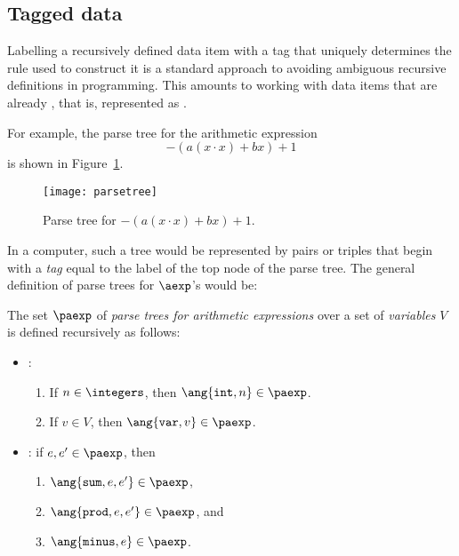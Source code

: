 \begin{definition}
\begin{editingnotes}

\section{Tagged data}

Labelling a recursively defined data item with a tag that uniquely
determines the rule used to construct it is a standard approach to
avoiding ambiguous recursive definitions in programming.  This
amounts to working with data items that are already , that
is, represented as .

For example, the parse tree for the arithmetic expression
\begin{equation}\label{ax}
-(a(x\cdot x)+ bx) + 1
\end{equation}
is shown in Figure~\ref{fig:parse}.

\begin{figure}
\texttt{[image: parsetree]}
\caption{Parse tree for $-(a(x\cdot x)+ bx) + 1$.}
\label{fig:parse}
\end{figure}

In a computer, such a tree would be represented by pairs or triples
that begin with a
\emph{tag} equal to the label of the top node of the parse tree.  
The general definition of parse trees for $\aexp$'s would be:


\begin{definition}\label{arithparse}
The set $\paexp$ of \emph{parse trees for arithmetic expressions} 
over a set of
\emph{variables} $V$ is defined recursively as follows:
\begin{itemize}
\item {}:
\begin{enumerate}
\item If $n \in \integers$, then $\ang{\texttt{int}, n} \in \paexp$.
\item If $v \in V$, then $\ang{\texttt{var}, v} \in \paexp$.
\end{enumerate}
\item {}: if $e,e' \in \paexp$, then
\begin{enumerate}
\item $\ang{\texttt{sum}, e, e'} \in \paexp$,
\item $\ang{\texttt{prod}, e, e'} \in \paexp$, and
\item $\ang{\texttt{minus}, e} \in \paexp$.
\end{enumerate}
\end{itemize}
\end{definition}


\end{editingnotes}
\end{definition}
